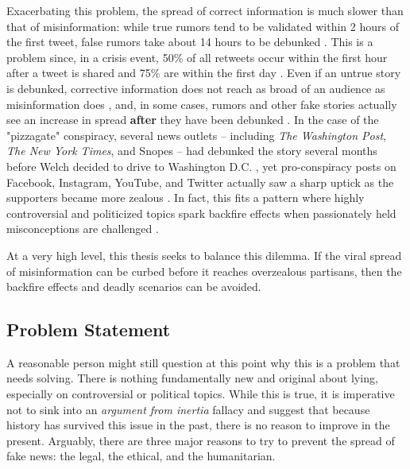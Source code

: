 \documentclass[12pt]{article}
\begin{document}
Exacerbating this problem, the spread of correct information is much slower than that of misinformation: while true rumors tend to be validated within 2 hours of the first tweet, false rumors take about 14 hours to be debunked \cite{zubiaga2016analysing,shao2016hoaxy}. This is a problem since, in a crisis event, 50\% of all retweets occur within the first hour after a tweet is shared and 75\% are within the first day \cite{kwak2010twitter}. Even if an untrue story is debunked, corrective information does not reach as broad of an audience as misinformation does \cite{maddock2015characterizing, vosoughi2018spread}, and, in some cases, rumors and other fake stories actually see an increase in spread \textbf{after} they have been debunked \cite{starbird2014rumors}. In the case of the "pizzagate" conspiracy, several news outlets -- including \textit{The Washington Post}, \textit{The New York Times}, and Snopes -- had debunked the story several months before Welch decided to drive to Washington D.C. \cite{kang2016fake,lacapria2016fact,board_2016}, yet pro-conspiracy posts on Facebook, Instagram, YouTube, and Twitter actually saw a sharp uptick as the supporters became more zealous \cite{kang2016washington}. In fact, this fits a pattern where highly controversial and politicized topics spark backfire effects when passionately held misconceptions are challenged \cite{gollust2009polarizing,nyhan2010corrections,nyhan2013hazards,redlawsk2010affective,schaffner2016misinformation,hart2012boomerang}.

At a very high level, this thesis seeks to balance this dilemma. If the viral spread of misinformation can be curbed before it reaches overzealous partisans, then the backfire effects and deadly scenarios can be avoided. 

\subsection{Problem Statement}
\label{Problem Statement}
A reasonable person might still question at this point why this is a problem that needs solving. There is nothing fundamentally new and original about lying, especially on controversial or political topics. While this is true, it is imperative not to sink into an \textit{argument from inertia} fallacy \cite{bennett2012logically} and suggest that because history has survived this issue in the past, there is no reason to improve in the present. Arguably, there are three major reasons to try to prevent the spread of fake news: the legal, the ethical, and the humanitarian.
\end{document}
